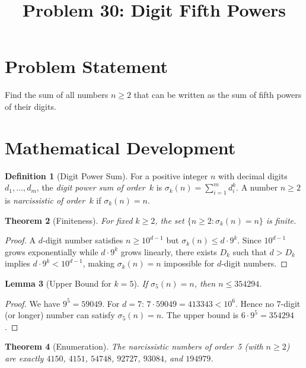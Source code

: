 \documentclass[12pt,a4paper]{article}
\title{Problem 30: Digit Fifth Powers}
\author{}
\date{}
\newtheorem{theorem}{Theorem}
\newtheorem{lemma}[theorem]{Lemma}
\theoremstyle{definition}
\newtheorem{definition}[theorem]{Definition}
\begin{document}
\maketitle

\section{Problem Statement}

Find the sum of all numbers $n \geq 2$ that can be written as the sum of fifth powers of their digits.

\section{Mathematical Development}

\begin{definition}[Digit Power Sum]
For a positive integer $n$ with decimal digits $d_1, \ldots, d_m$, the \emph{digit power sum of order~$k$} is $\sigma_k(n) = \sum_{i=1}^{m} d_i^k$. A number $n \geq 2$ is \emph{narcissistic of order~$k$} if $\sigma_k(n) = n$.
\end{definition}

\begin{theorem}[Finiteness]\label{thm:finite}
For fixed $k \geq 2$, the set $\{n \geq 2 : \sigma_k(n) = n\}$ is finite.
\end{theorem}

\begin{proof}
A $d$-digit number satisfies $n \geq 10^{d-1}$ but $\sigma_k(n) \leq d \cdot 9^k$. Since $10^{d-1}$ grows exponentially while $d \cdot 9^k$ grows linearly, there exists $D_k$ such that $d > D_k$ implies $d \cdot 9^k < 10^{d-1}$, making $\sigma_k(n) = n$ impossible for $d$-digit numbers.
\end{proof}

\begin{lemma}[Upper Bound for $k = 5$]\label{lem:bound}
If $\sigma_5(n) = n$, then $n \leq 354294$.
\end{lemma}

\begin{proof}
We have $9^5 = 59049$. For $d = 7$: $7 \cdot 59049 = 413343 < 10^6$. Hence no 7-digit (or longer) number can satisfy $\sigma_5(n) = n$. The upper bound is $6 \cdot 9^5 = 354294$.
\end{proof}

\begin{theorem}[Enumeration]\label{thm:enum}
The narcissistic numbers of order~5 (with $n \geq 2$) are exactly $4150$, $4151$, $54748$, $92727$, $93084$, and $194979$.
\end{theorem}
\end{document}
